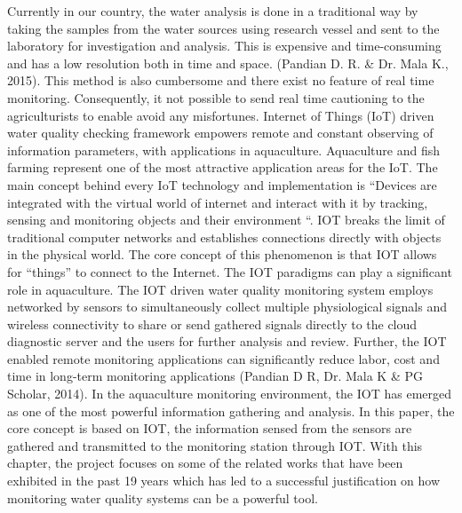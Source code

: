 \documentclass[12pt]{article}
\begin{document}
Currently in our country, the water analysis is done in a traditional way by taking the samples from the water sources using research vessel and sent to the laboratory for investigation and analysis. This is expensive and time-consuming and has a low resolution both in time and space. (Pandian D. R. \& Dr. Mala K., 2015). This method is also cumbersome and there exist no feature of real time monitoring. Consequently, it not possible to send real time cautioning to the agriculturists to enable avoid any misfortunes.
Internet of Things (IoT) driven water quality checking framework empowers remote and constant observing of information parameters, with applications in aquaculture. Aquaculture and fish farming represent one of the most attractive application areas for the IoT. The main concept behind every IoT technology and implementation is “Devices are integrated with the virtual world of internet and interact with it by tracking, sensing and monitoring objects and their environment “. IOT breaks the limit of traditional computer networks and establishes connections directly with objects in the physical world. The core concept of this phenomenon is that IOT allows for “things” to connect to the Internet. The IOT paradigms can play a significant role in aquaculture. The IOT driven water quality monitoring system employs networked by sensors to simultaneously collect multiple physiological signals and wireless connectivity to share or send gathered signals directly to the cloud diagnostic server and the users for further analysis and review. Further, the IOT enabled remote monitoring applications can significantly reduce labor, cost and time in long-term monitoring applications (Pandian D R, Dr. Mala K \& PG Scholar, 2014).  In the aquaculture monitoring environment, the IOT has emerged as one of the most powerful information gathering and analysis. In this paper, the core concept is based on IOT, the information sensed from the sensors are gathered and transmitted to the monitoring station through IOT. 
With this chapter, the project focuses on some of the related works that have been exhibited in the past 19 years which has led to a successful justification on how monitoring water quality systems can be a powerful tool. 

\end{document}
